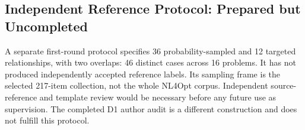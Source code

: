 \subsection{Independent Reference Protocol: Prepared but Uncompleted}
\label{app:future-reference}
A separate first-round protocol specifies 36 probability-sampled and 12 targeted relationships, with two overlaps: 46 distinct cases across 16 problems. It has not produced independently accepted reference labels. Its sampling frame is the selected 217-item collection, not the whole NL4Opt corpus. Independent source-reference and template review would be necessary before any future use as supervision. The completed D1 author audit is a different construction and does not fulfill this protocol.
